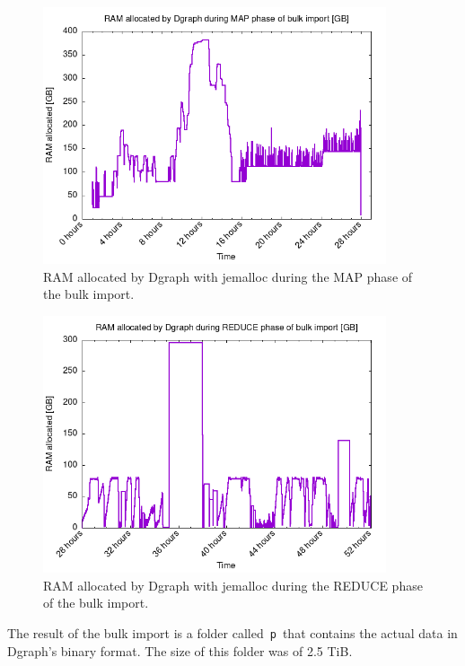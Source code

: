 \begin{figure}[H]
    \centering
    \includegraphics[width=0.9\textwidth]{Figures/results/MAP_RAM.png}
    \caption{RAM allocated by Dgraph with jemalloc during the MAP phase of the bulk import.}
    \label{fig:import-ram-usage}
\end{figure}

\begin{figure}[H]
    \centering
    \includegraphics[width=0.9\textwidth]{Figures/results/REDUCE_RAM.png}
    \caption{RAM allocated by Dgraph with jemalloc during the REDUCE phase of the bulk import.}
    \label{fig:import-cpu-usage}
\end{figure}

The result of the bulk import is a folder called~{\tt p}~that contains the actual data in Dgraph's binary format. The size of this folder was of 2.5 TiB. 

